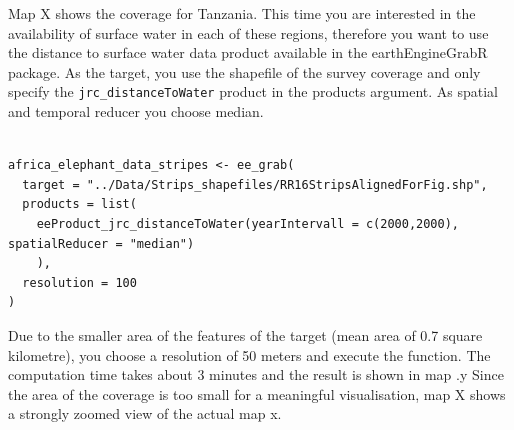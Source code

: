 \documentclass[11pt,twoside,a4paper,final]{report}
\begin{document}
Map X shows the coverage for Tanzania. This time you are interested in the availability of surface water in each of these regions, therefore you want to use the distance to surface water data product available in the earthEngineGrabR package. As the target, you use the shapefile of the survey coverage and only specify the \texttt{jrc\_distanceToWater} product in the products argument. As spatial and temporal reducer you choose median. 

\begin{lstlisting}

africa_elephant_data_stripes <- ee_grab(
  target = "../Data/Strips_shapefiles/RR16StripsAlignedForFig.shp", 
  products = list(
    eeProduct_jrc_distanceToWater(yearIntervall = c(2000,2000), spatialReducer = "median")
    ),
  resolution = 100
)
\end{lstlisting}




Due to the smaller area of the features of the target (mean area of 0.7 square kilometre), you choose a resolution of 50 meters and execute the function. The computation time takes about 3 minutes and the result is shown in map .y Since the area of the coverage is too small for a meaningful visualisation, map X shows a strongly zoomed view of the actual map x. 
\end{document}
